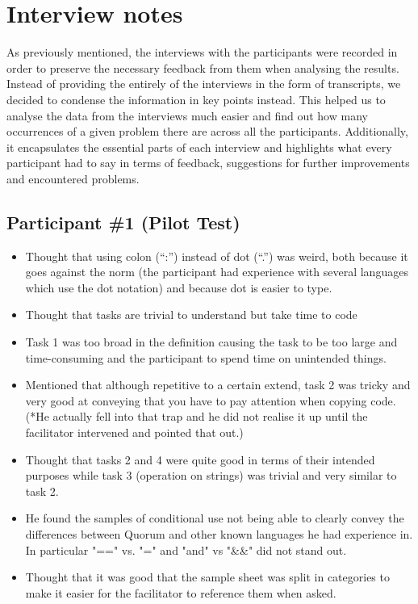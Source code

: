 \chapter{Interview notes}
As previously mentioned, the interviews with the participants were recorded in order to preserve the necessary feedback from them when analysing the results. Instead of providing the entirely of the interviews in the form of transcripts, we decided to condense the information in key points instead. This helped us to analyse the data from the interviews much easier and find out how many occurrences of a given problem there are across all the participants. Additionally, it encapsulates the essential parts of each interview and highlights what every participant had to say in terms of feedback, suggestions for further improvements and encountered problems.
\section{Participant {\#}1 (Pilot Test)}
\begin{itemize}
\item Thought that using colon (“:”) instead of dot (“.”) was weird, both because it goes against the norm (the participant had experience with several languages which use the dot notation) and because dot is easier to type. 
\item Thought that tasks are trivial to understand but take time to code
\item Task 1 was too broad in the definition causing the task to be too large and time-consuming and the participant to spend time on unintended things.
\item Mentioned that although repetitive to a certain extend, task 2 was tricky and very good at conveying that you have to pay attention when copying code. 
(*He actually fell into that trap and he did not realise it up until the facilitator intervened and pointed that out.) 
\item Thought that tasks 2 and 4 were quite good in terms of their intended purposes while task 3 (operation on strings) was trivial and very similar to task 2. 
\item He found the samples of conditional use not being able to clearly convey the differences between Quorum and other known languages he had experience in. In particular "==" vs. "=" and "and" vs "\&\&" did not stand out.
\item Thought that it was good that the sample sheet was split in categories to make it easier for the facilitator to reference them when asked.
\end{itemize}
